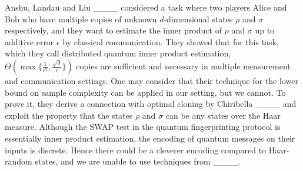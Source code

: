 Anshu, Landau and Liu ____ considered a task where two players
Alice and Bob who have multiple copies of unknown $d$-dimensional states $\rho$ and $\sigma$ respectively, and they want to estimate the inner product of $\rho$ and $\sigma$ up to additive error $\epsilon$ by classical communication. They showed that for this task, which they call distributed quantum inner product estimation, $\Theta( \max \{ \frac{1}{\epsilon^2}, \frac{\sqrt{d}}{\epsilon} \})$ copies are sufficient and necessary in multiple measurement and communication settings. One may consider that their technique for the lower bound on sample complexity can be applied in our setting, but we cannot. To prove it, they derive a connection with optimal cloning by Chiribella ____ and exploit the property that the states $\rho$ and $\sigma$ can be any states over the Haar measure. Although the SWAP test in the quantum fingerprinting protocol is essentially inner product estimation, the encoding of quantum messages on their inputs is discrete. Hence there could be a cleverer encoding compared to Haar-random states, and we are unable to use techniques from ____.